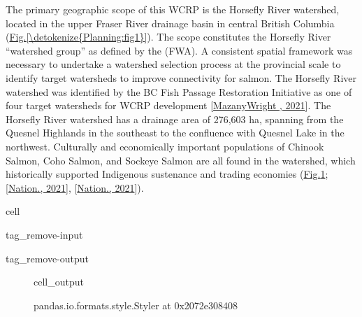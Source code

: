 \documentclass[letterpaper,10pt,english]{jupyterBook}
\begin{document}
\sphinxAtStartPar
The primary geographic scope of this WCRP is the Horsefly River watershed, located in the upper Fraser River drainage basin in central British Columbia (\hyperref[\detokenize{Planning:fig1}]{Fig.\@ \ref{\detokenize{Planning:fig1}}}). The scope constitutes the Horsefly River “watershed group” as defined by the  (FWA). A consistent spatial framework was necessary to undertake a watershed selection process at the provincial scale to identify target watersheds to improve connectivity for salmon. The Horsefly River watershed was identified by the BC Fish Passage Restoration Initiative as one of four target watersheds for WCRP development {[}\hyperlink{cite.references:id13}{Mazany\sphinxhyphen{}Wright , 2021}{]}. The Horsefly River watershed has a drainage area of 276,603 ha, spanning from the Quesnel Highlands in the southeast to the confluence with Quesnel Lake in the northwest. Culturally and economically important populations of Chinook Salmon, Coho Salmon, and Sockeye Salmon are all found in the watershed, which historically supported Indigenous sustenance and trading economies (\hyperref[\detokenize{Planning:table3}]{Fig.\@ \ref{\detokenize{Planning:table3}}}; {[}\hyperlink{cite.references:id28}{Nation., 2021}{]}, {[}\hyperlink{cite.references:id31}{Nation., 2021}{]}).

\begin{sphinxuseclass}{cell}
\begin{sphinxuseclass}{tag_remove-input}
\begin{sphinxuseclass}{tag_remove-output}
\end{sphinxuseclass}
\end{sphinxuseclass}
\end{sphinxuseclass}
\begin{figure}[htbp]
\centering
\capstart
\begin{sphinxVerbatimOutput}

\begin{sphinxuseclass}{cell_output}
\begin{sphinxVerbatim}[commandchars=\\\{\}]
\PYGZlt{}pandas.io.formats.style.Styler at 0x2072e308408\PYGZgt{}
\end{sphinxVerbatim}

\end{sphinxuseclass}\end{sphinxVerbatimOutput}
\caption{}\label{\detokenize{Planning:table3}}\end{figure}
\end{document}
